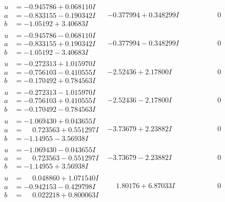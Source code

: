 \documentclass[1p]{elsarticle_modified}
\theoremstyle{definition}
\begin{document}
$$\begin{array}{c|c|c}
\begin{aligned}
u &= -0.945786 + 0.068110 I \\
a &= -0.833155 - 0.190342 I \\
b &= -1.05192 + 3.40683 I\end{aligned}
 & -0.377994 + 0.348299 I & \phantom{-0.000000 } 0 \\ \hline\begin{aligned}
u &= -0.945786 - 0.068110 I \\
a &= -0.833155 + 0.190342 I \\
b &= -1.05192 - 3.40683 I\end{aligned}
 & -0.377994 - 0.348299 I & \phantom{-0.000000 } 0 \\ \hline\begin{aligned}
u &= -0.272313 + 1.015970 I \\
a &= -0.756103 - 0.410555 I \\
b &= -0.170492 + 0.784563 I\end{aligned}
 & -2.52436 + 2.17800 I & \phantom{-0.000000 } 0 \\ \hline\begin{aligned}
u &= -0.272313 - 1.015970 I \\
a &= -0.756103 + 0.410555 I \\
b &= -0.170492 - 0.784563 I\end{aligned}
 & -2.52436 - 2.17800 I & \phantom{-0.000000 } 0 \\ \hline\begin{aligned}
u &= -1.069430 + 0.043655 I \\
a &= \phantom{-}0.723563 + 0.551297 I \\
b &= -1.14955 - 3.56938 I\end{aligned}
 & -3.73679 + 2.23882 I & \phantom{-0.000000 } 0 \\ \hline\begin{aligned}
u &= -1.069430 - 0.043655 I \\
a &= \phantom{-}0.723563 - 0.551297 I \\
b &= -1.14955 + 3.56938 I\end{aligned}
 & -3.73679 - 2.23882 I & \phantom{-0.000000 } 0 \\ \hline\begin{aligned}
u &= \phantom{-}0.048860 + 1.071540 I \\
a &= -0.942153 - 0.429798 I \\
b &= \phantom{-}0.022218 + 0.800063 I\end{aligned}
 & \phantom{-}1.80176 + 6.87033 I & \phantom{-0.000000 } 0 \\ \hline\begin{aligned}

\end{aligned}
\end{array}$$
\end{document}
